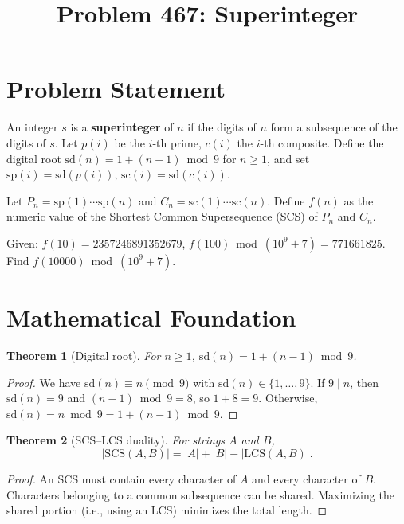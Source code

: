 \documentclass[11pt]{article}
\title{Problem 467: Superinteger}
\author{}
\date{}
\newtheorem{theorem}{Theorem}
\begin{document}
\maketitle

\section{Problem Statement}

An integer $s$ is a \textbf{superinteger} of $n$ if the digits of $n$ form a subsequence of the digits of $s$. Let $p(i)$ be the $i$-th prime, $c(i)$ the $i$-th composite. Define the digital root $\mathrm{sd}(n) = 1 + (n-1) \bmod 9$ for $n \ge 1$, and set $\mathrm{sp}(i) = \mathrm{sd}(p(i))$, $\mathrm{sc}(i) = \mathrm{sd}(c(i))$.

Let $P_n = \mathrm{sp}(1)\cdots\mathrm{sp}(n)$ and $C_n = \mathrm{sc}(1)\cdots\mathrm{sc}(n)$. Define $f(n)$ as the numeric value of the Shortest Common Supersequence (SCS) of $P_n$ and $C_n$.

Given: $f(10) = 2357246891352679$, $f(100) \bmod (10^9+7) = 771661825$. Find $f(10000) \bmod (10^9+7)$.

\section{Mathematical Foundation}

\begin{theorem}[Digital root]
\label{thm:dr}
For $n \ge 1$, $\mathrm{sd}(n) = 1 + (n-1) \bmod 9$.
\end{theorem}

\begin{proof}
We have $\mathrm{sd}(n) \equiv n \pmod{9}$ with $\mathrm{sd}(n) \in \{1, \ldots, 9\}$. If $9 \mid n$, then $\mathrm{sd}(n) = 9$ and $(n-1) \bmod 9 = 8$, so $1 + 8 = 9$. Otherwise, $\mathrm{sd}(n) = n \bmod 9 = 1 + (n-1) \bmod 9$.
\end{proof}

\begin{theorem}[SCS--LCS duality]
\label{thm:scs}
For strings $A$ and $B$,
\[
|\mathrm{SCS}(A, B)| = |A| + |B| - |\mathrm{LCS}(A, B)|.
\]
\end{theorem}

\begin{proof}
An SCS must contain every character of $A$ and every character of $B$. Characters belonging to a common subsequence can be shared. Maximizing the shared portion (i.e., using an LCS) minimizes the total length.
\end{proof}
\end{document}

